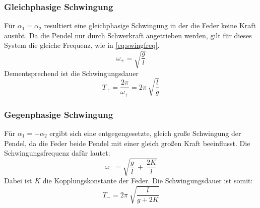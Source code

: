 \subsubsection{Gleichphasige Schwingung}
Für $\alpha_1 = \alpha_2$ resultiert eine gleichphasige Schwingung in der die Feder keine Kraft ausübt.
Da die Pendel nur durch Schwerkraft angetrieben werden, gilt für dieses System die gleiche Frequenz, wie in \autoref{eq:swingfreq}.
\begin{equation}
    \omega_+ = \sqrt{\frac{g}{l}}
\end{equation}
Dementsprechend ist die Schwingungsdauer
\begin{equation}
    T_+ = \frac{2\pi}{\omega_+} = 2\pi\ \sqrt{\frac{l}{g}}
    \label{eq:lol1}
\end{equation}

\subsubsection{Gegenphasige Schwingung}
Für $\alpha_1 = -\alpha_2$ ergibt sich eine entgegengesetzte, gleich große Schwingung der Pendel, da die Feder beide Pendel mit einer gleich großen Kraft beeinflusst.
Die Schwingungsfrequenz dafür lautet:
\begin{equation}
    \omega_- = \sqrt{\frac{g}{l}\ +\ \frac{2K}{l}}
\end{equation}
Dabei ist $K$ die Kopplungskonstante der Feder.
Die Schwingungsdauer ist somit:
\begin{equation}
    T_- = 2\pi\ \sqrt{\frac{l}{g+2K}}
    \label{eq:lol2}
\end{equation}

